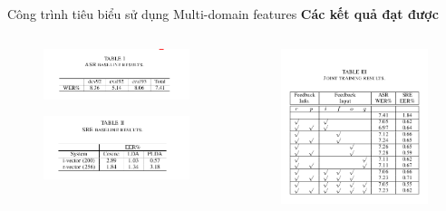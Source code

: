 \documentclass[notheorems, aspectratio=54]{beamer}
\begin{document}
\begin{frame}{Công trình tiêu biểu sử dụng Multi-domain features}
	\textbf{Các kết quả đạt được}
	\begin{columns}
		\begin{column}{0.5\textwidth}
			\begin{figure}[H]
				\includegraphics[width=0.8\linewidth]{images/multi-task-recurrent-model-asr-baseline-res.png}
			\end{figure}
			\begin{figure}[H]
				\includegraphics[width=0.8\linewidth]{images/multi-task-recurrent-model-sre-baseline-res.png}
			\end{figure}
		\end{column}
		\begin{column}{0.5\textwidth}
			\begin{figure}[H]
				\includegraphics[width=0.75\linewidth]{images/multi-task-recurrent-model-joint-training-res.png}

\end{figure}
\end{column}
\end{columns}
\end{frame}
\end{document}
